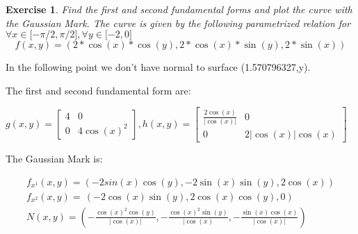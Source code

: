 \documentclass[a4paper]{article}
\newtheorem{exercise}[theorem]{Exercise}
\begin{document}
\begin{exercise}
Find the first and second fundamental forms and plot the curve with the
Gaussian Mark. The curve is given by the following parametrized relation for 
$\forall x\in \lbrack -\pi /2,\pi /2],\forall y\in \lbrack -2,0]$%
\begin{equation*}
f(x,y)=(2\ast \cos (x)\ast \cos (y),2\ast \cos (x)\ast \sin (y),2\ast \sin
(x))
\end{equation*}
\end{exercise}

In the following point we don't have normal to surface (1.570796327,y).

The first and second fundamental form are:

\begin{center}
$g(x,y)=%
\begin{bmatrix}
4 & 0 \\ 
0 & 4\cos (x)^{2}%
\end{bmatrix}%
,h(x,y)=%
\begin{bmatrix}
\frac{2\cos (x)}{|\cos (x)|} & 0 \\ 
0 & 2|\cos (x)|\cos (x)%
\end{bmatrix}%
$
\end{center}

The Gaussian Mark is:

\begin{equation*}
\begin{array}{c}
f_{x^{1}}(x,y)=(-2sin(x)\cos (y),-2\sin (x)\sin (y),2\cos (x)) \\ 
f_{x^{2}}(x,y)=\,(-2\cos (x)\sin (y),2\cos (x)\cos (y),0) \\ 
N(x,y)=\left( -\frac{\cos (x)^{2}\cos (y)}{|\cos (x)|},-\frac{\cos
(x)^{2}\sin (y)}{|\cos (x)},-\frac{\sin (x)\cos (x)}{|\cos (x)|}\right) 
\end{array}%
\end{equation*}

\begin{center}
\end{center}
\end{document}
